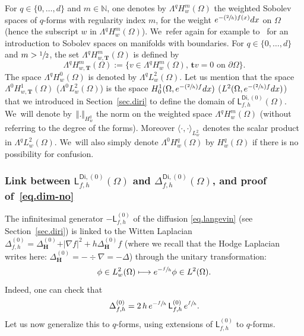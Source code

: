 \documentclass[JEP,XML,SOM,Unicode,NoEqCountersInSection,NoFloatCountersInSection,published]{cedram}
\newcommand{\Psfrac}[2]{(\sfrac{#1}{#2})}
\newcommand\mto{\mathchoice{\longmapsto}{\mapsto}{\mapsto}{\mapsto}}
\newcommand{\mbf}[1]{\mathbf{#1}}
\theoremstyle{plain}
\theoremstyle{definition}
\begin{document}
For $q\in \{0, \ldots,d\}$ and $m\in \mathbb N$, one denotes by
$\Lambda^qH^m_w(\Omega)$\label{page.wsobolevq} the weighted Sobolev spaces of $q$-forms with
regularity index $m$, for the weight $e^{-\Psfrac{2}{h} f(x)}dx$ on
$\Omega$ (hence the subscript $w$ in $\Lambda^qH^m_w(\Omega)$). We~refer again for example to~\cite{GSchw} for an introduction to Sobolev spaces on manifolds with boundaries. For $q\in\{0,\ldots,d\}$ and $m> \sfrac{1}{2}$, the set $\Lambda^qH^m_{w,\mbf T}(\Omega)$ is defined by
\[
\Lambda^qH^m_{w,\mbf T}(\Omega):=\{v\in \Lambda^qH^m_w(\Omega),\, \mathbf tv=0 \text{ on }\partial \Omega\}.
\]
The space
$\Lambda^qH^0_w(\Omega)$ is denoted by $\Lambda^qL^2_w(\Omega)$. Let us mention that the space $\Lambda^0H^1_{w,\mbf T}(\Omega)$ (\resp $\Lambda^0L^2_w(\Omega)$) is
the space $H^{1}_{0}(\Omega,e^{-\Psfrac 2h f}dx)$ (\resp $L^2(\Omega,e^{-\Psfrac 2h f}dx)$) that we introduced in Section~\ref{sec.diri} to
define the domain of $\mathsf L^{\mathsf{Di},(0)}_{f,h}(\Omega)$. We~will denote by~$\Vert. \Vert_{H^q_w}$ the norm on the weighted space $\Lambda^qH^m_w
(\Omega)$ (without referring to the degree of the forms). Moreover $\langle
\cdot, \cdot\rangle_{L^2_w}$ denotes the scalar product in $\Lambda^qL^2_w (\Omega)$. We~will also simply denote $\Lambda^0H^q_w(\Omega)$ by $H^q_w(\Omega)$ if there is no possibility for confusion.

\subsubsection{Link between $\mathsf L^{\mathsf{Di}, (0)}_{f,h}(\Omega)$ and $\Delta^{\mathsf{Di}, (0)}_{f,h}(\Omega)$, and proof of~\eqref{eq.dim-no}}

The infinitesimal generator $-\mathsf L^{(0)}_{f,h}$ of the diffusion
\eqref{eq.langevin} (see Section~\ref{sec.diri}) is linked to the
Witten Laplacian $\Delta^{(0)}_{f,h} = \Delta^{(0)}_{\mbf H} +\vert
\nabla f\vert^2+h\Delta^{(0)}_{\mbf H}f$ (where we recall that the
Hodge Laplacian writes here: $\Delta^{(0)}_{\mbf H}=-\div \nabla=-\Delta$)
through the unitary transformation:
\[
\phi \in L^2_w(\Omega) \mto e^{-\sfrac{f}{h}} \phi \in L^2(\Omega).
\]
Indeed, one can check that
\begin{equation}\label{eq:unitary_p0}
\Delta^{ (0)}_{f,h} = 2\, h \, e^{-\sfrac{f}{h}} \, \mathsf L^{(0)}_{f,h} \, e^{\sfrac{f}{h}}.
\end{equation}
Let us now generalize this to $q$-forms, using extensions of
$\mathsf L^{(0)}_{f,h}$ to $q$-forms.
\end{document}
